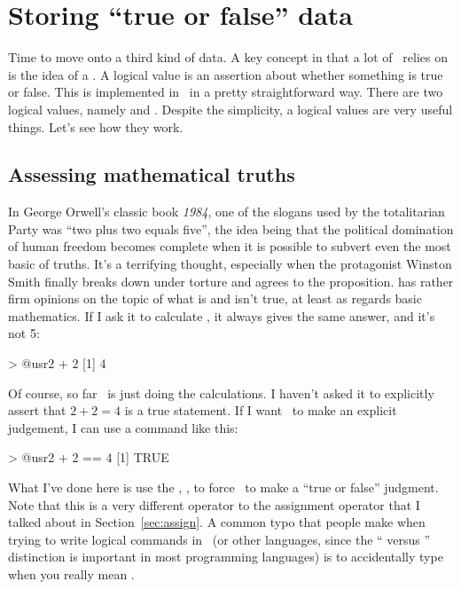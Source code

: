 \section{Storing ``true or false'' data\label{sec:logicals}}

Time to move onto a third kind of data. A key concept in that a lot of \R\ relies on is the idea of a . A logical value is an assertion about whether something is true or false. This is implemented in \R\ in a pretty straightforward way. There are two logical values, namely  and . Despite the simplicity, a logical values are very useful things. Let's see how they work.

\subsection{Assessing mathematical truths}

In George Orwell's classic book {\it 1984}, one of the slogans used by the totalitarian Party was ``two plus two equals five'', the idea being that the political domination of human freedom becomes complete when it is possible to subvert even the most basic of truths. It's a terrifying thought, especially when the protagonist Winston Smith finally breaks down under torture and agrees to the proposition. \R has rather firm opinions on the topic of what is and isn't true, at least as regards basic mathematics. If I ask it to calculate , it always gives the same answer, and it's not 5:
\begin{rblock1}
> @usr{2 + 2}
[1] 4
\end{rblock1}
Of course, so far \R\ is just doing the calculations. I haven't asked it to explicitly assert that $2+2 = 4$ is a true statement. If I want \R\ to make an explicit judgement, I can use a command like this: 
\begin{rblock1}
> @usr{2 + 2 == 4}
[1] TRUE
\end{rblock1}
What I've done here is use the , \rtext{==}, to force \R\ to make a ``true or false'' judgment. Note that this is a very different operator to the assignment operator \rtextsmall{=} that I talked about in Section~\ref{sec:assign}. A common typo that people make when trying to write logical commands in \R\ (or other languages, since the ``\rtextsmall{=} versus \rtextsmall{==}'' distinction is important in most programming languages) is to accidentally type \rtextsmall{=} when you really mean \rtextsmall{==}.

